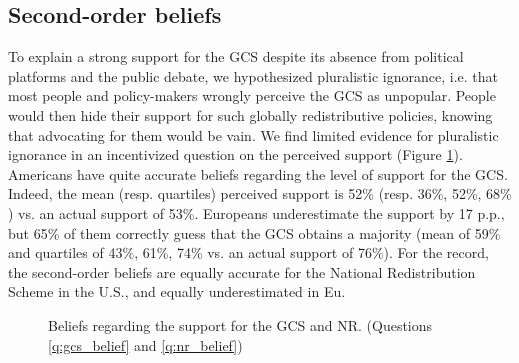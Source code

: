 

\subsection{Second-order beliefs}
To explain a strong support for the GCS despite its absence from political platforms and the public debate, we hypothesized pluralistic ignorance, i.e. that most people and policy-makers wrongly perceive the GCS as unpopular. People would then hide their support for such globally redistributive policies, knowing that advocating for them would be vain. We find limited evidence for pluralistic ignorance in an incentivized question on the perceived support (Figure \ref{fig:belief}). Americans have quite accurate beliefs regarding the level of support for the GCS. Indeed, the mean (resp. quartiles) perceived support is 52\% (resp. 36\%, 52\%, 68\%%
) vs. an actual support of 53\%. Europeans underestimate the support by 17 p.p., but 65\% of them correctly guess that the GCS obtains a majority (mean of 59\% and quartiles of 43\%, 61\%, 74\% vs. an actual support of 76\%). For the record, the second-order beliefs are equally accurate for the National Redistribution Scheme in the U.S., and equally underestimated in Eu.%

\begin{figure}[h!]
    \caption[Beliefs about support for the GCS and NR]{Beliefs regarding the support for the GCS and NR. (Questions \ref{q:gcs_belief} and \ref{q:nr_belief})}\label{fig:belief}
\end{figure}

